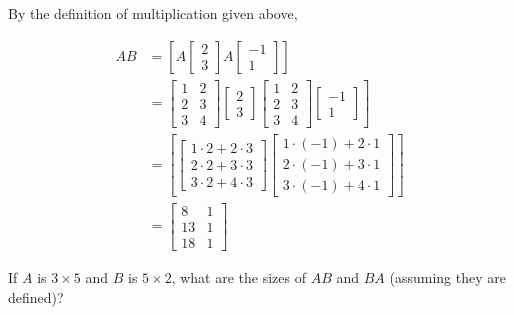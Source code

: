 \begin{solution}
    By the definition of multiplication given above,

\[
\begin{aligned}
A B & =\left[A\left[\begin{array}{l}
2 \\
3
\end{array}\right] A\left[\begin{array}{c}
-1 \\
1
\end{array}\right]\right] \\
& \left.=\left[\begin{array}{ll}
1 & 2 \\
2 & 3 \\
3 & 4
\end{array}\right]\left[\begin{array}{l}
2 \\
3
\end{array}\right]\left[\begin{array}{ll}
1 & 2 \\
2 & 3 \\
3 & 4
\end{array}\right]\left[\begin{array}{c}
-1 \\
1
\end{array}\right]\right] \\
& =\left[\left[\begin{array}{l}
1 \cdot 2+2 \cdot 3 \\
2 \cdot 2+3 \cdot 3 \\
3 \cdot 2+4 \cdot 3
\end{array}\right]\left[\begin{array}{l}
1 \cdot(-1)+2 \cdot 1 \\
2 \cdot(-1)+3 \cdot 1 \\
3 \cdot(-1)+4 \cdot 1
\end{array}\right]\right] \\
& =\left[\begin{array}{cc}
8 & 1 \\
13 & 1 \\
18 & 1
\end{array}\right]
\end{aligned}
\]
\end{solution}

\begin{example} If $A$ is $3 \times 5$ and $B$ is $5 \times 2$, what are the sizes of $A B$ and $B A$ (assuming they are defined)?
\end{example}

